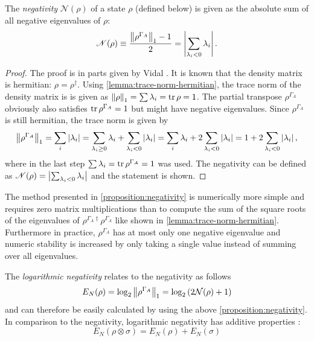 \begin{proposition}\label{proposition:negativity}
  The \emph{negativity} $\mathscr{N}(\rho)$ of a state $\rho$ (defined below) is given as the absolute sum of all negative eigenvalues of $\rho$: 
\begin{equation}
    \mathscr{N}(\rho) \equiv \frac{\left\lVert\rho^{\Gamma_A}\right\rVert_1 - 1}{2} = \left\lvert\sum_{\lambda_i < 0} \lambda_i\right\rvert.
\end{equation}
\end{proposition}
\begin{proof}
  The proof is in parts given by Vidal \cite{Vidal_2001}. It is known that the density matrix is hermitian: $\rho = \rho^\dagger$. Using \cref{lemma:trace-norm-hermitian}, the trace norm of the density matrix is is given as $\left\lVert\rho\right\rVert_1=\sum \lambda_i = \tr \rho = 1$. The partial transpose $\rho^{\Gamma_A}$ obviously also satisfies $\tr \rho^{\Gamma_A} = 1$ but might have negative eigenvalues. Since $\rho^{\Gamma_A}$ is still hermitian, the trace norm is given by
  \begin{equation*}
    \left\lVert\rho^{\Gamma_A}\right\rVert_1 = \sum_i\left\lvert\lambda_i\right\rvert = \sum_{\lambda_i \ge 0} \lambda_i + \sum_{\lambda_i < 0} \left\lvert\lambda_i\right\rvert = \sum_i \lambda_i + 2\sum_{\lambda_i < 0} \left\lvert\lambda_i\right\rvert = 1 + 2\sum_{\lambda_i < 0} \left\lvert\lambda_i\right\rvert ,
  \end{equation*}
  where in the last step $\sum \lambda_i = \tr \rho^{\Gamma_A} = 1$ was used. The negativity can be defined as $\mathscr{N}(\rho) = \left\lvert\sum_{\lambda_i < 0} \lambda_i\right\rvert$ and the statement is shown.
\end{proof}
\begin{remark}
  The method presented in \cref{proposition:negativity} is numerically more simple and requires zero matrix multiplications than to compute the sum of the square roots of the eigenvalues of $\rho^{\Gamma_A \dagger} \rho^{\Gamma_A}$ like shown in \cref{lemma:trace-norm-hermitian}. Furthermore in practice, $\rho^{\Gamma_A}$ has at most only one negative eigenvalue and numeric stability is increased by only taking a single value instead of summing over all eigenvalues.
\end{remark}
\begin{remark}
  The \emph{logarithmic negativity} \cite{Plenio_2005} relates to the negativity as follows
  \begin{equation}
    E_N(\rho) = \log_2 \left\lVert\rho^{\Gamma_A}\right\rVert_1 = \log_2 \left( 2\mathcal{N}(\rho) + 1 \right)
  \end{equation}
  and can therefore be easily calculated by using the above \cref{proposition:negativity}. In comparison to the negativity, logarithmic negativity has additive properties \cite{Plenio_2005a}:
  \begin{equation*}
    E_N\left(\rho \otimes \sigma \right) = E_N(\rho) + E_N(\sigma) 
  \end{equation*}
\end{remark}




